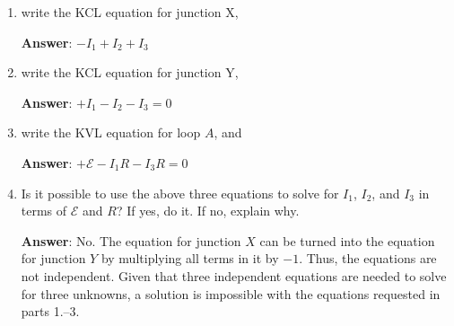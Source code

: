\documentclass{article}
\begin{document}
\begin{enumerate}

  \item write the KCL equation for junction X,

        \ifsolutions
        \textbf{Answer}: $-I_1+I_2+I_3$
        \else
        \vskip 36pt
        \fi

  \item write the KCL equation for junction Y,

        \ifsolutions
        \textbf{Answer}: $+I_1-I_2-I_3=0$
        \else
        \vskip 36pt
        \fi

  \item write the KVL equation for loop $A$, and

        \ifsolutions
        \textbf{Answer}: $+\mathcal{E}-I_1R-I_3R=0$
        \else
        \vskip 36pt
        \fi

  \item Is it possible to use the above three equations to solve for $I_1$, $I_2$, and $I_3$ in terms of $\mathcal{E}$ and $R$? If yes, do it. If no, explain why.

        \ifsolutions
        \textbf{Answer}: No. The equation for junction $X$ can be turned into the equation for junction $Y$ by multiplying all terms in it by $-1$. Thus, the equations are not independent. Given that three independent equations are needed to solve for three unknowns, a solution is impossible with the equations requested in parts 1.--3.
        \fi

\end{enumerate}
\end{document}
